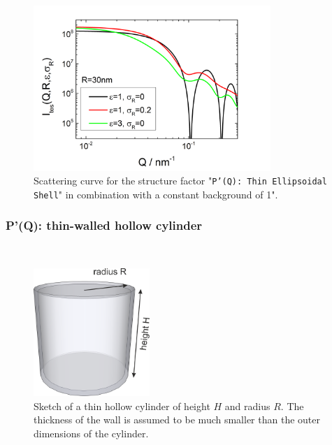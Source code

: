 \begin{figure}[htb]
\begin{center}
\includegraphics[width=0.8\textwidth,height=0.55\textwidth]{../images/form_factor/anisotropic/PprimeThinEllShell.png}
\end{center}
\caption{Scattering curve for the structure factor "\texttt{P'(Q): Thin Ellipsoidal Shell}" in combination with a constant background of 1".}
\label{fig_IQ:PprimeThinEllShell}
\end{figure}

\clearpage
\subsubsection{P'(Q): thin-walled hollow cylinder} ~\\
\label{plugin:Pprime4hollowcylinder}

\begin{figure}[htb]
\begin{center}
\includegraphics[width=0.3922\textwidth,height=0.4318\textwidth]{../images/form_factor/anisotropic/ThinHollowCylinder.png}
\end{center}
\caption{Sketch of a thin hollow cylinder of height $H$ and radius $R$. The thickness of the wall is assumed to be much smaller than the outer dimensions of the cylinder.}
\label{fig:ThinHollowCylinder}
\end{figure}

